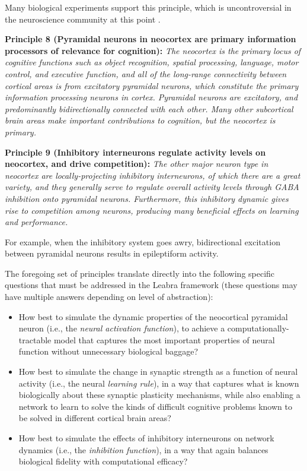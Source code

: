 \documentclass[11pt,twoside]{article}
\begin{document}
Many biological experiments support this principle, which is
uncontroversial in the neuroscience community at this point
\cite{ltpsynapserefs}.

{\bf Principle 8 (Pyramidal neurons in neocortex are primary
  information processors of relevance for cognition):} {\em The
  neocortex is the primary locus of cognitive functions such as object
  recognition, spatial processing, language, motor control, and
  executive function, and all of the long-range connectivity between
  cortical areas is from excitatory pyramidal neurons, which
  constitute the primary information processing neurons in cortex.
  Pyramidal neurons are excitatory, and predominantly bidirectionally
  connected with each other.  Many other subcortical brain areas make
  important contributions to cognition, but the neocortex is primary.}

{\bf Principle 9 (Inhibitory interneurons regulate activity levels on
  neocortex, and drive competition):} {\em The other major neuron type
  in neocortex are locally-projecting inhibitory interneurons, of
  which there are a great variety, and they generally serve to
  regulate overall activity levels through GABA inhibition onto
  pyramidal neurons.  Furthermore, this inhibitory dynamic gives rise
  to competition among neurons, producing many beneficial effects on
  learning and performance.}

For example, when the inhibitory system goes awry, bidirectional
excitation between pyramidal neurons results in epileptiform activity.

The foregoing set of principles translate directly into the following
specific questions that must be addressed in the Leabra framework
(these questions may have multiple answers depending on level of
abstraction):
\begin{itemize}
\item How best to simulate the dynamic properties of the neocortical
  pyramidal neuron (i.e., the {\em neural activation function}), to
  achieve a computationally-tractable model that captures the most
  important properties of neural function without unnecessary
  biological baggage?
\item How best to simulate the change in synaptic strength as a
  function of neural activity (i.e., the neural {\em learning rule}),
  in a way that captures what is known biologically about these
  synaptic plasticity mechanisms, while also enabling a network to
  learn to solve the kinds of difficult cognitive problems known to be
  solved in different cortical brain areas?
\item How best to simulate the effects of inhibitory interneurons on
  network dynamics (i.e., the {\em inhibition function}), in a way
  that again balances biological fidelity with computational efficacy?
\end{itemize}
\end{document}
